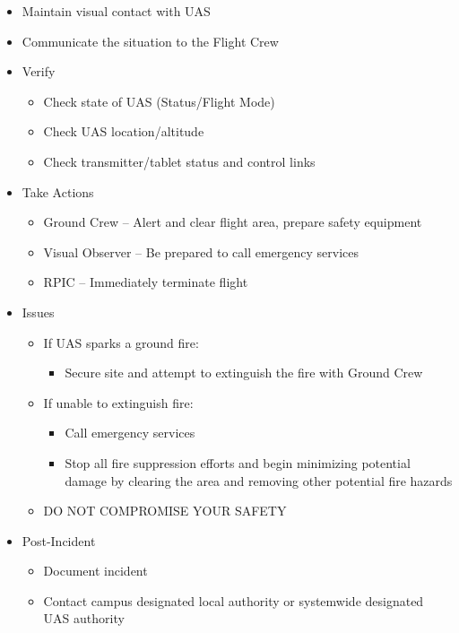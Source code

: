 \documentclass[
]{book}
\providecommand{\tightlist}{%
  \setlength{\itemsep}{0pt}\setlength{\parskip}{0pt}}
\begin{document}
\begin{itemize}
\tightlist
\item
  Maintain visual contact with UAS
\item
  Communicate the situation to the Flight Crew
\item
  Verify

  \begin{itemize}
  \tightlist
  \item
    Check state of UAS (Status/Flight Mode)
  \item
    Check UAS location/altitude
  \item
    Check transmitter/tablet status and control links
  \end{itemize}
\item
  Take Actions

  \begin{itemize}
  \tightlist
  \item
    Ground Crew -- Alert and clear flight area, prepare safety equipment
  \item
    Visual Observer -- Be prepared to call emergency services
  \item
    RPIC -- Immediately terminate flight
  \end{itemize}
\item
  Issues

  \begin{itemize}
  \tightlist
  \item
    If UAS sparks a ground fire:

    \begin{itemize}
    \tightlist
    \item
      Secure site and attempt to extinguish the fire with Ground Crew
    \end{itemize}
  \item
    If unable to extinguish fire:

    \begin{itemize}
    \tightlist
    \item
      Call emergency services
    \item
      Stop all fire suppression efforts and begin minimizing potential damage by clearing the area and removing other potential fire hazards
    \end{itemize}
  \item
    DO NOT COMPROMISE YOUR SAFETY
  \end{itemize}
\item
  Post-Incident

  \begin{itemize}
  \tightlist
  \item
    Document incident
  \item
    Contact campus designated local authority or systemwide designated UAS authority
  \end{itemize}
\end{itemize}
\end{document}
